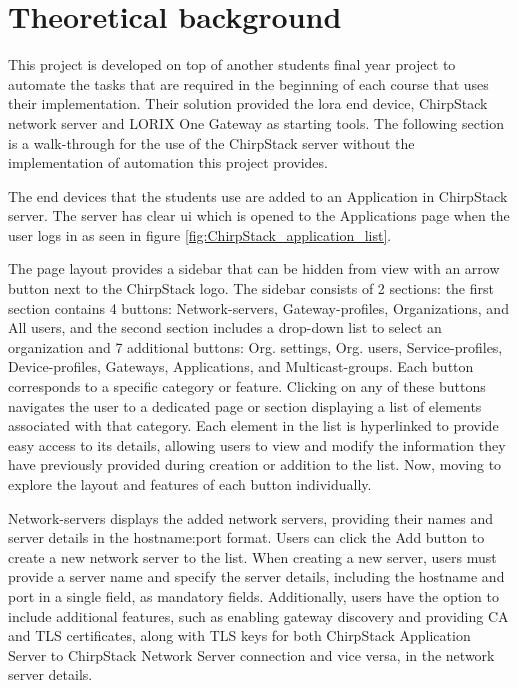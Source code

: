 
\chapter{Theoretical background} \label{ch:theor_backgr}

This project is developed on top of another students final year project \cite{theseus:gere-zoltan} to automate the tasks that are required in the beginning of each course that uses their implementation.
Their solution provided the \gls{lora} end device, ChirpStack network server and LORIX One Gateway as starting tools.
The following section is a walk-through for the use of the ChirpStack server without the implementation of automation this project provides.

The end devices that the students use are added to an Application in ChirpStack server.
The server has clear \gls{ui} which is opened to the Applications page when the user logs in as seen in figure \ref{fig:ChirpStack_application_list}.

The page layout provides a sidebar that can be hidden from view with an arrow button next to the ChirpStack logo.
The sidebar consists of 2 sections: the first section contains 4 buttons: Network-servers, Gateway-profiles, Organizations, and All users, and the second section includes a drop-down list to select an organization and 7 additional buttons: Org. settings, Org. users, Service-profiles, Device-profiles, Gateways, Applications, and Multicast-groups.
Each button corresponds to a specific category or feature.
Clicking on any of these buttons navigates the user to a dedicated page or section displaying a list of elements associated with that category.
Each element in the list is hyperlinked to provide easy access to its details, allowing users to view and modify the information they have previously provided during creation or addition to the list.
Now, moving to explore the layout and features of each button individually.

Network-servers displays the added network servers, providing their names and server details in the hostname:port format.
Users can click the Add button to create a new network server to the list.
When creating a new server, users must provide a server name and specify the server details, including the hostname and port in a single field, as mandatory fields.
Additionally, users have the option to include additional features, such as enabling gateway discovery and providing CA and TLS certificates, along with TLS keys for both ChirpStack Application Server to ChirpStack Network Server connection and vice versa, in the network server details.

